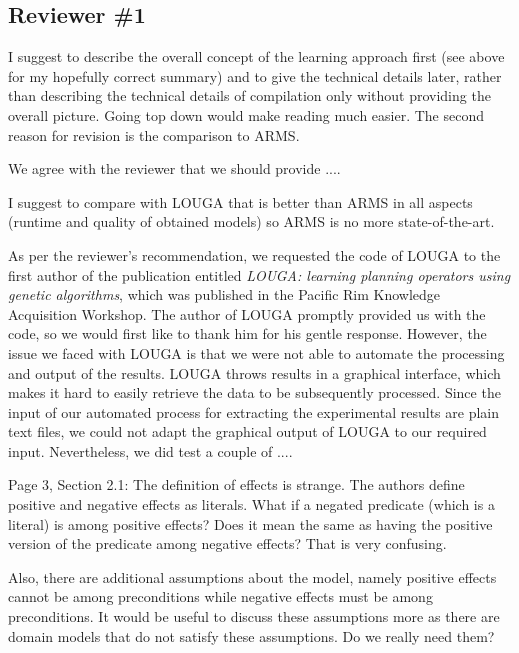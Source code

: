 \documentclass{article}
\begin{document}
\subsection*{Reviewer \#1}

\vspace*{.3cm}

\begin{mdframed}[hidealllines=true,backgroundcolor=gray!20]
I suggest to describe the overall concept of the learning approach first (see above for my hopefully correct summary) and to give the technical details later, rather than describing the technical details of compilation only without providing the overall picture. Going top down would make reading much easier. The second reason for revision is the comparison to ARMS.
\end{mdframed}

We agree with the reviewer that we should provide ....

\begin{mdframed} [hidealllines=true,backgroundcolor=gray!20]
I suggest to compare with LOUGA that is better than ARMS in all aspects (runtime and quality of obtained models) so ARMS is no more state-of-the-art.
\end{mdframed}

As per the reviewer's recommendation, we requested the code of LOUGA to the first author of the publication entitled \emph{LOUGA: learning planning operators using genetic algorithms}, which was published in the Pacific Rim Knowledge Acquisition Workshop. The author of LOUGA promptly provided us with the code, so we would first like to thank him for his gentle response. However, the issue we faced with LOUGA is that we were not able to automate the processing and output of the results. LOUGA throws results in a graphical interface, which makes it hard to easily retrieve the data to be subsequently processed. Since the input of our automated process for extracting the experimental results are plain text files, we could not adapt the graphical output of LOUGA to our required input. Nevertheless, we did test a couple of .... 



\begin{mdframed}[hidealllines=true,backgroundcolor=gray!20]
 Page 3, Section 2.1: The definition of effects is strange. The authors define positive and negative effects as literals. What if a negated predicate (which is a literal) is among positive effects? Does it mean the same as having the positive version of the predicate among negative effects? That is very confusing.

Also, there are additional assumptions about the model, namely positive effects cannot be among preconditions while negative effects must be among preconditions. It would be useful to discuss these assumptions more as there are domain models that do not satisfy these assumptions. Do we really need them?
\end{mdframed}
\end{document}

